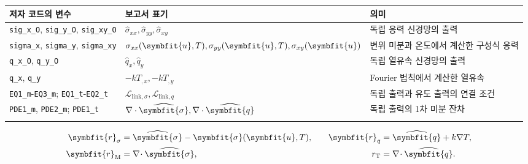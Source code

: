 \documentclass[10pt,a4paper]{article}
\renewcommand{\boldsymbol}[1]{\symbfit{#1}}
\begin{document}
\par\begin{minipage}{\linewidth}\begin{tabular}{>{\raggedright\arraybackslash}p{}>{\raggedright\arraybackslash}p{}>{\raggedright\arraybackslash}p{}}

\rowcolor{tint} \textbf{저자 코드의 변수} & \textbf{보고서 표기} & \textbf{의미}\\\midrule

\nolinkurl{sig_x_O}, \nolinkurl{sig_y_O}, \nolinkurl{sig_xy_O} & $\widehat\sigma_{xx},\widehat\sigma_{yy},\widehat\sigma_{xy}$ & 독립 응력 신경망의 출력\\\addlinespace[2pt]

\nolinkurl{sigma_x}, \nolinkurl{sigma_y}, \nolinkurl{sigma_xy} & $\sigma_{xx}(\boldsymbol u,T),\sigma_{yy}(\boldsymbol u,T),\sigma_{xy}(\boldsymbol u)$ & 변위 미분과 온도에서 계산한 구성식 응력\\\addlinespace[2pt]

\nolinkurl{q_x_O}, \nolinkurl{q_y_O} & $\widehat q_x,\widehat q_y$ & 독립 열유속 신경망의 출력\\\addlinespace[2pt]

\nolinkurl{q_x}, \nolinkurl{q_y} & $-kT_{,x},-kT_{,y}$ & Fourier 법칙에서 계산한 열유속\\\addlinespace[2pt]

\nolinkurl{EQ1_m}-\nolinkurl{EQ3_m}; \nolinkurl{EQ1_t}-\nolinkurl{EQ2_t} & $\mathcal L_{\mathrm{link},\sigma},\mathcal L_{\mathrm{link},q}$ & 독립 출력과 유도 출력의 연결 조건\\\addlinespace[2pt]

\nolinkurl{PDE1_m}, \nolinkurl{PDE2_m}; \nolinkurl{PDE1_t} & $\nabla\cdot\widehat{\boldsymbol\sigma},\nabla\cdot\widehat{\boldsymbol q}$ & 독립 출력의 1차 미분 잔차\\\addlinespace[2pt]

\bottomrule\end{tabular}\end{minipage}\par\vspace{5pt}\endgroup

\begin{equation}\begin{aligned}\boldsymbol r_{\sigma}&=\widehat{\boldsymbol\sigma}-\boldsymbol\sigma(\boldsymbol u,T),&\quad\boldsymbol r_q&=\widehat{\boldsymbol q}+k\nabla T,\\\boldsymbol r_{\mathrm M}&=\nabla\!\cdot\widehat{\boldsymbol\sigma},&r_{\mathrm T}&=\nabla\!\cdot\widehat{\boldsymbol q}.\end{aligned}\end{equation}
\end{document}
